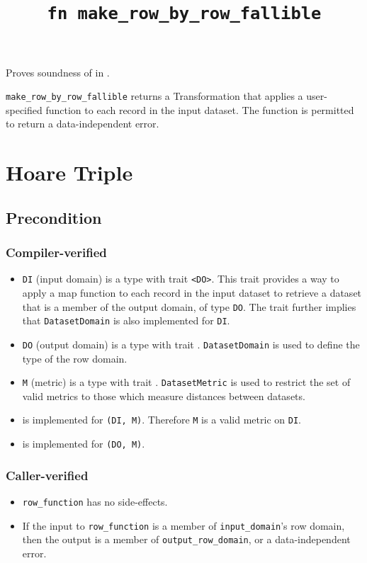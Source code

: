 \documentclass{article}
\title{\texttt{fn make\_row\_by\_row\_fallible}}
\author{\MichaelShoemateAuthor}
\date{}
\begin{document}
\maketitle
\contrib
Proves soundness of  in .

\texttt{make\_row\_by\_row\_fallible} returns a Transformation that applies a user-specified function to each record in the input dataset.
The function is permitted to return a data-independent error.

\section{Hoare Triple}
\subsection*{Precondition}
\subsubsection*{Compiler-verified}
\begin{itemize}
    \item \texttt{DI} (input domain) is a type with trait \texttt{<DO>}.
        This trait provides a way to apply a map function to each record in the input dataset to retrieve a dataset that is a member of the output domain, of type \texttt{DO}. The trait further implies that \texttt{DatasetDomain} is also implemented for \texttt{DI}.
    \item \texttt{DO} (output domain) is a type with trait .
        \texttt{DatasetDomain} is used to define the type of the row domain.
    \item \texttt{M} (metric) is a type with trait .
        \texttt{DatasetMetric} is used to restrict the set of valid metrics to those which measure distances between datasets.
    \item {} is implemented for \texttt{(DI, M)}. Therefore \texttt{M} is a valid metric on \texttt{DI}.
    \item {} is implemented for \texttt{(DO, M)}.
\end{itemize}

\subsubsection*{Caller-verified}
\begin{itemize}
    \item \texttt{row\_function} has no side-effects.
    \item If the input to \texttt{row\_function} is a member of \texttt{input\_domain}'s row domain, then the output is a member of \texttt{output\_row\_domain}, or a data-independent error.
\end{itemize}
\end{document}
